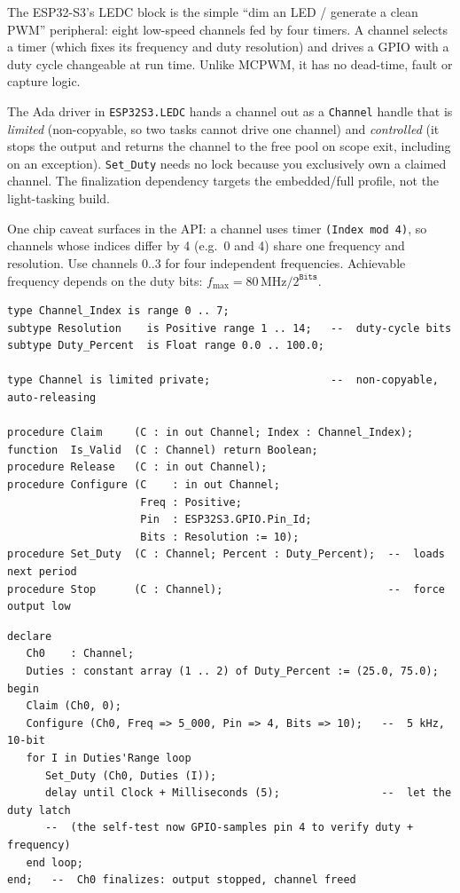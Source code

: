 The ESP32-S3's LEDC block is the simple ``dim an LED / generate a clean PWM''
peripheral: eight low-speed channels fed by four timers. A channel selects a
timer (which fixes its frequency and duty resolution) and drives a GPIO with a
duty cycle changeable at run time. Unlike MCPWM, it has no dead-time, fault or
capture logic.

The Ada driver in \texttt{ESP32S3.LEDC} hands a channel out as a \texttt{Channel}
handle that is \emph{limited} (non-copyable, so two tasks cannot drive one
channel) and \emph{controlled} (it stops the output and returns the channel to
the free pool on scope exit, including on an exception). \texttt{Set\_Duty} needs no lock because you exclusively own a claimed channel. The finalization
dependency targets the embedded/full profile, not the light-tasking build.

One chip caveat surfaces in the API: a channel uses timer \texttt{(Index mod 4)},
so channels whose indices differ by 4 (e.g.\ 0 and 4) share one frequency and
resolution. Use channels 0..3 for four independent frequencies. Achievable
frequency depends on the duty bits: $f_{\max} = 80\,\mathrm{MHz} / 2^{\texttt{Bits}}$.

\begin{lstlisting}
type Channel_Index is range 0 .. 7;
subtype Resolution    is Positive range 1 .. 14;   --  duty-cycle bits
subtype Duty_Percent  is Float range 0.0 .. 100.0;

type Channel is limited private;                   --  non-copyable, auto-releasing

procedure Claim     (C : in out Channel; Index : Channel_Index);
function  Is_Valid  (C : Channel) return Boolean;
procedure Release   (C : in out Channel);
procedure Configure (C    : in out Channel;
                     Freq : Positive;
                     Pin  : ESP32S3.GPIO.Pin_Id;
                     Bits : Resolution := 10);
procedure Set_Duty  (C : Channel; Percent : Duty_Percent);  --  loads next period
procedure Stop      (C : Channel);                          --  force output low
\end{lstlisting}

\begin{lstlisting}
declare
   Ch0    : Channel;
   Duties : constant array (1 .. 2) of Duty_Percent := (25.0, 75.0);
begin
   Claim (Ch0, 0);
   Configure (Ch0, Freq => 5_000, Pin => 4, Bits => 10);   --  5 kHz, 10-bit
   for I in Duties'Range loop
      Set_Duty (Ch0, Duties (I));
      delay until Clock + Milliseconds (5);                --  let the duty latch
      --  (the self-test now GPIO-samples pin 4 to verify duty + frequency)
   end loop;
end;   --  Ch0 finalizes: output stopped, channel freed
\end{lstlisting}


